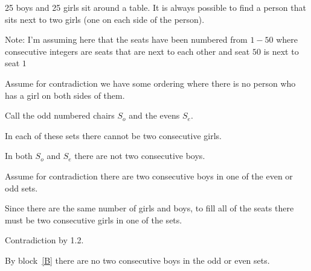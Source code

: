 \documentclass[11pt]{article}
\begin{document}
\begin{problems}


  \newpage

  \problem

  \begin{theorem}
      25 boys and 25 girls sit around a table. It is always possible to find a person 
      that sits next to two girls (one on each side of the person).
  \end{theorem}

  \smallskip

  Note: I'm assuming here that the seats have been numbered from $1-50$ where 
  consecutive integers are seats that are next to each other and seat $50$ is next to seat $1$

  \begin{longFormProof}

    \begin{block}[A]
     {Assume for contradiction we have some ordering where there is no person who has a girl on both sides of them.}

      \step Call the odd numbered chairs $S_o$ and the evens $S_e$.
      
      \step In each of these sets there cannot be two consecutive girls.


    
        \smallskip 
        \hrulefill
        \smallskip 

        \begin{lemma}
          In both $S_o$ and $S_e$ there are not two consecutive boys.
        \end{lemma}

        \begin{longFormProof}
          \begin{block}[B]
          {Assume for contradiction there are two consecutive boys in one of the even or odd sets.}

            \step Since there are the same number of girls and boys, to fill all of the seats there must be two consecutive girls in one of the sets.

            \step Contradiction by 1.2.

          \end{block}

          \step By block~\ref{B} there are no two consecutive boys in the odd or even sets.
        \end{longFormProof}


\end{block}
\end{longFormProof}
\end{problems}
\end{document}
